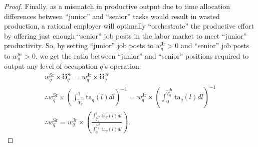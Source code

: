 \documentclass[hidelinks, nonatbib]{elsarticle}
\begin{document}
\begin{theorem}
\begin{proof}
        Finally, as a mismatch in productive output due to time allocation differences between ``junior'' and ``senior'' tasks would result in wasted production, a rational employer will optimally ``orchestrate'' the productive effort by offering just enough ``senior'' job posts in the labor market to meet ``junior'' productivity. So, by setting ``junior'' job posts to $w_{q}^{\text{Jr}} > 0$ and ``senior'' job posts to $w_{q}^{\text{Sr}} > 0$, we get the ratio between ``junior'' and ``senior'' positions required to output any level of occupation $q$'s operation:
        \begin{gather}
            w_{q}^{\text{Sr}} \times 
            \mho_{q}^{\text{Sr}} = 
            w_{q}^{\text{Jr}} \times 
            \mho_{q}^{\text{Jr}}
            \\
            \therefore
            w_{q}^{\text{Sr}} \times 
            \left(
                \int_{\tilde{T}_{q}^{\text{Jr}}}^{1}
                    \text{ta}_q(l)
                    dl
            \right) ^ {-1}
            = 
            w_{q}^{\text{Jr}} \times 
            \left(
                \int_{0}^{\tilde{T}_{q}^{\text{Jr}}}
                    \text{ta}_q(l)
                    dl
            \right) ^ {-1}
            \\
            \therefore
            w_{q}^{\text{Sr}}
            = 
            w_{q}^{\text{Jr}}
            \times
            \left(
                \frac{
                    \int_{\tilde{T}_{q}^{\text{Jr}}}^{1}
                        \text{ta}_q(l)
                        dl
                }{
                    \int_{0}^{\tilde{T}_{q}^{\text{Jr}}}
                        \text{ta}_q(l)
                        dl
                }
            \right)
            .
        \end{gather}
        

\end{proof}
\end{theorem}
\end{document}
